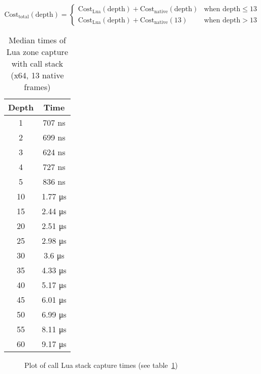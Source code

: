 \documentclass[hidelinks,titlepage,a4paper,twoside]{article}
\begin{document}
\begin{displaymath}
\text{Cost}_{\text{total}}(\text{depth}) =
\begin{cases}
\text{Cost}_{\text{Lua}}(\text{depth}) + \text{Cost}_{\text{native}}(\text{depth}) & \text{when depth} \leq 13 \\
\text{Cost}_{\text{Lua}}(\text{depth}) + \text{Cost}_{\text{native}}(13) & \text{when depth} > 13
\end{cases}
\end{displaymath}

\begin{table}[h]
\centering
\begin{tabular}[h]{c|c}
\textbf{Depth} & \textbf{Time} \\ \hline
1 & 707 \si{\nano\second} \\
2 & 699 \si{\nano\second} \\
3 & 624 \si{\nano\second} \\
4 & 727 \si{\nano\second} \\
5 & 836 \si{\nano\second} \\
10 & 1.77 \si{\micro\second} \\
15 & 2.44 \si{\micro\second} \\
20 & 2.51 \si{\micro\second} \\
25 & 2.98 \si{\micro\second} \\
30 & 3.6 \si{\micro\second} \\
35 & 4.33 \si{\micro\second} \\
40 & 5.17 \si{\micro\second} \\
45 & 6.01 \si{\micro\second} \\
50 & 6.99 \si{\micro\second} \\
55 & 8.11 \si{\micro\second} \\
60 & 9.17 \si{\micro\second}
\end{tabular}
\caption{Median times of Lua zone capture with call stack (x64, 13 native frames)}
\label{CallstackTimesLua}
\end{table}

\begin{figure}[h]
\centering{}
\caption{Plot of call Lua stack capture times (see table~\ref{CallstackTimesLua})}
\label{CallstackPlotLua}
\end{figure}
\end{document}
